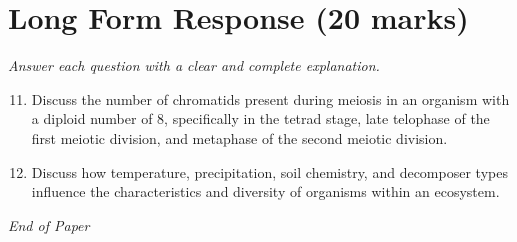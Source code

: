 \documentclass[12pt]{article}
\begin{document}
\section*{Long Form Response (20 marks)}
\textit{Answer each question with a clear and complete explanation.}
\begin{enumerate}[label=\arabic*.]
\setcounter{enumi}{10}
\item Discuss the number of chromatids present during meiosis in an organism with a diploid number of 8, specifically in the tetrad stage, late telophase of the first meiotic division, and metaphase of the second meiotic division.
\item Discuss how temperature, precipitation, soil chemistry, and decomposer types influence the characteristics and diversity of organisms within an ecosystem.
\end{enumerate}

\vfill
\noindent\textit{End of Paper}
\end{document}
